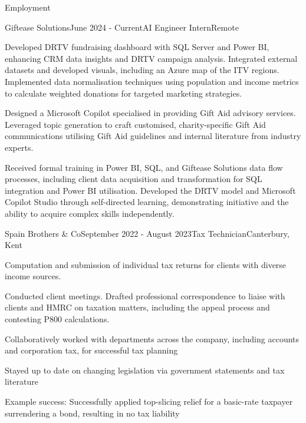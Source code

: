 \documentclass[
	11pt, %
]{resume} %
\begin{document}
\begin{rSection}{Employment}

	\begin{rSubsection}{Giftease Solutions}{June 2024 - Current}{AI Engineer Intern}{Remote}
		\item Developed DRTV fundraising dashboard with SQL Server and Power BI, enhancing CRM data insights and DRTV campaign analysis. Integrated external datasets and developed visuals, including an Azure map of the ITV regions. Implemented data normalisation techniques using population and income metrics to calculate weighted donations for targeted marketing strategies.
		\item Designed a Microsoft Copilot specialised in providing Gift Aid advisory services. Leveraged topic generation to craft customised, charity-specific Gift Aid communications utilising Gift Aid guidelines and internal literature from industry experts. 
        \item Received formal training in Power BI, SQL, and Giftease Solutions data flow processes, including client data acquisition and transformation for SQL integration and Power BI utilisation. Developed the DRTV model and Microsoft Copilot Studio through self-directed learning, demonstrating initiative and the ability to acquire complex skills independently.
	\end{rSubsection}


	\begin{rSubsection}{Spain Brothers \& Co}{September 2022 - August 2023}{Tax Technician}{Canterbury, Kent}
		\item Computation and submission of individual tax returns for clients with diverse income sources. 
		\item Conducted client meetings. Drafted professional correspondence to liaise with clients and HMRC on taxation matters, including the appeal process and contesting P800 calculations.  
		\item Collaboratively worked with departments across the company, including accounts and corporation tax, for successful tax planning 
		\item Stayed up to date on changing legislation via government statements and tax literature
         \item Example success: Successfully applied top-slicing relief for a basic-rate taxpayer surrendering a bond, resulting in no tax liability
	\end{rSubsection}


\end{rSection}
\end{document}
